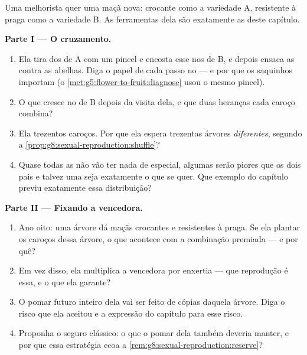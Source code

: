 \begin{problem}\label{pb:g8:sexual-reproduction:1}
Uma melhorista quer uma maçã nova: crocante como a variedade A,
resistente à praga como a variedade B. As ferramentas dela são
exatamente as deste capítulo.

\medskip\noindent\textbf{Parte I --- O cruzamento.}
\begin{enumerate}
  \item Ela tira  dos  de A com um pincel e encosta esse
         nos  de B, e depois ensaca as  contra as
        abelhas. Diga o papel de cada passo no  --- e por que os
        saquinhos importam (o
        \cref{met:g5:flower-to-fruit:diagnose} usou o mesmo pincel).
  \item O que cresce no  de B depois da visita dela, e que duas
        heranças cada caroço combina?
  \item Ela  trezentos caroços. Por que ela espera trezentas
        árvores \emph{diferentes}, segundo a
        \cref{prop:g8:sexual-reproduction:shuffle}?
  \item Quase todas as  não vão ter nada de especial,
        algumas serão piores que os dois pais e talvez uma seja
        exatamente o que se quer. Que exemplo do capítulo previu
        exatamente essa distribuição?
\end{enumerate}

\medskip\noindent\textbf{Parte II --- Fixando a vencedora.}
\begin{enumerate}[resume]
  \item Ano oito: uma árvore dá maçãs crocantes e resistentes à
        praga. Se ela plantar os caroços dessa árvore, o que acontece
        com a combinação premiada --- e por quê?
  \item Em vez disso, ela multiplica a vencedora por enxertia --- que
        reprodução é essa, e o que ela garante?
  \item O pomar futuro inteiro dela vai ser feito de cópias daquela
        árvore. Diga o risco que ela aceitou e a expressão do capítulo
        para esse risco.
  \item Proponha o seguro clássico: o que o pomar dela também deveria
        manter, e por que essa estratégia ecoa a
        \cref{rem:g8:sexual-reproduction:reserve}?
\end{enumerate}


\end{problem}
